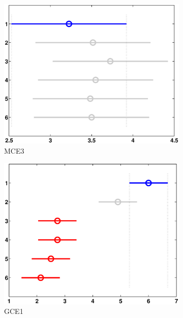 \begin{figure}
\begin{subfigure}[b]{0.49\linewidth}
		\includegraphics[width=\linewidth]{Figures/B-Bonferroni_HNMED_VS_ED3}
		\caption{MCE3} \label{fig:Bon_M3} 
	\end{subfigure}
	\begin{subfigure}[b]{0.49\linewidth}
		\includegraphics[width=\linewidth]{Figures/B-Bonferroni_HNMED_VS_ED4}
		\caption{GCE1} \label{fig:Bon_G1} 
	\end{subfigure}
	\begin{subfigure}[b]{0.49\linewidth}

\end{subfigure}
\end{figure}
